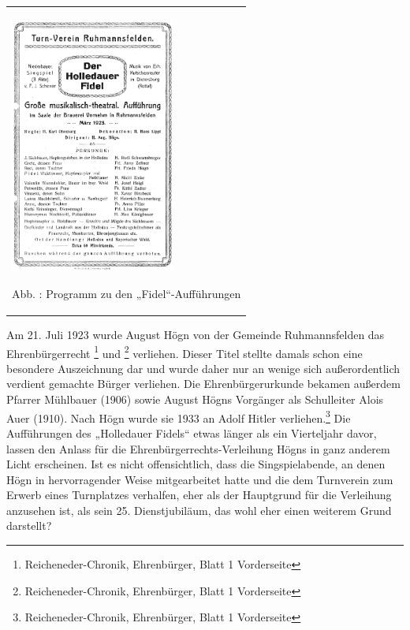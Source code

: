 \begin{center}
\begin{minipage}{5.794cm}
\begin{center}
\tablefirsthead{}
\tablehead{}
\tabletail{}
\tablelasttail{}
\begin{supertabular}{m{5.5940003cm}}

\includegraphics[width=5.412cm,height=8.456cm]{pictures/zulassungsarbeit-img022.png}

Abb. : Programm zu den „Fidel“-Aufführungen\\
\end{supertabular}
\end{center}
\end{minipage}
\end{center}
Am 21. Juli 1923 wurde August Högn von der Gemeinde Ruhmannsfelden das
Ehrenbürgerrecht \footnote{Reicheneder-Chronik, Ehrenbürger, Blatt 1
Vorderseite} und \footnote{Reicheneder-Chronik, Ehrenbürger, Blatt 1
Vorderseite} verliehen. Dieser Titel stellte damals schon eine
besondere Auszeichnung dar und wurde daher nur an wenige sich
außerordentlich verdient gemachte Bürger verliehen. Die
Ehrenbürgerurkunde bekamen außerdem Pfarrer Mühlbauer (1906) sowie
August Högns Vorgänger als Schulleiter Alois Auer (1910). Nach Högn
wurde sie 1933 an Adolf Hitler verliehen.\footnote{Reicheneder-Chronik, Ehrenbürger, Blatt 1
Vorderseite} Die Aufführungen des „Holledauer Fidels“ etwas länger als
ein Vierteljahr davor, lassen den Anlass für die
Ehrenbürgerrechts-Verleihung Högns in ganz anderem Licht erscheinen.
Ist es nicht offensichtlich, dass die Singspielabende, an denen Högn in
hervorragender Weise mitgearbeitet hatte und die dem Turnverein zum
Erwerb eines Turnplatzes verhalfen, eher als der Hauptgrund für die
Verleihung anzusehen ist, als sein 25. Dienstjubiläum, das wohl eher
einen weiterem Grund darstellt?

